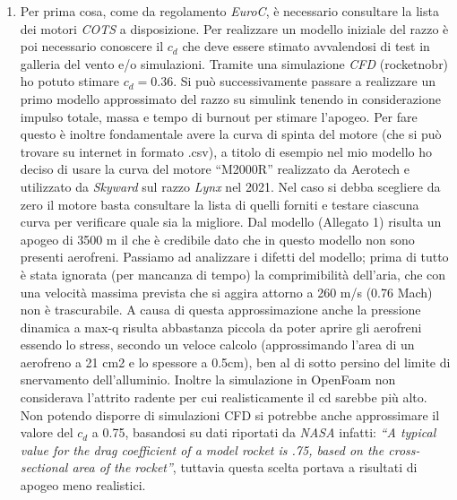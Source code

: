 \documentclass[11pt, a4paper]{article}
\begin{document}
\newpage
\vspace{10pt}
\setlength{\marginparwidth}{0pt}
\begin{enumerate}
\item Per prima cosa, come da regolamento \emph{EuroC}, è necessario consultare la lista dei motori \emph{COTS} a disposizione. Per realizzare un modello iniziale del razzo è poi necessario conoscere il \begin{math}c_d\end{math} che deve essere stimato avvalendosi di test in galleria del vento e/o simulazioni. Tramite una simulazione \emph{CFD} (rocketnobr) ho potuto stimare \begin{math}c_d=0.36\end{math}. Si può successivamente passare a realizzare un primo modello approssimato del razzo su simulink tenendo in considerazione impulso totale, massa e tempo di burnout per stimare l'apogeo. Per fare questo è inoltre fondamentale avere la curva di spinta del motore (che si può trovare su internet in formato .csv), a titolo di esempio nel mio modello ho deciso di usare la curva del motore ``M2000R'' realizzato da Aerotech e utilizzato da \emph{Skyward} sul razzo \emph{Lynx} nel 2021. Nel caso si debba scegliere da zero il motore basta consultare la lista di quelli forniti e testare ciascuna curva per verificare quale sia la migliore. Dal modello (Allegato 1) risulta un apogeo di 3500 m il che è credibile dato che in questo modello non sono presenti aerofreni. Passiamo ad analizzare i difetti del modello; prima di tutto è stata ignorata (per mancanza di tempo) la comprimibilità dell'aria, che con una velocità massima prevista che si aggira attorno a 260 m/s (0.76 Mach) non è trascurabile. A causa di questa approssimazione anche la pressione dinamica a max-q risulta abbastanza piccola da poter aprire gli aerofreni essendo lo stress, secondo un veloce calcolo (approssimando l'area di un aerofreno a 21 cm2 e lo spessore a 0.5cm), ben al di sotto persino del limite di snervamento dell'alluminio. Inoltre la simulazione in OpenFoam non considerava l'attrito radente per cui realisticamente il cd sarebbe più alto. Non potendo disporre di simulazioni CFD si potrebbe anche approssimare il valore del \begin{math}c_d\end{math} a 0.75, basandosi su dati riportati da \emph{NASA} infatti: \emph{``A typical value for the drag coefficient of a model rocket is .75, based on the cross-sectional area of the rocket''}, tuttavia questa scelta portava a risultati di apogeo meno realistici.

\end{enumerate}
\end{document}
